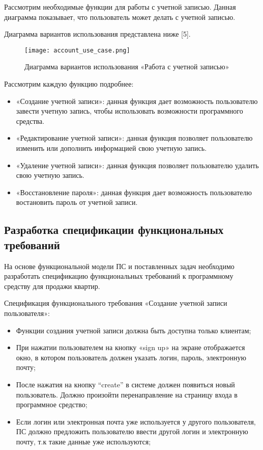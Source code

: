 Рассмотрим необходимые функции для работы с учетной записью. Данная диаграмма показывает, что пользователь может делать с учетной записью. 

Диаграмма вариантов использования представлена ниже [5].

\begin{figure}[!htb]
	\centering
	\texttt{[image: account\_use\_case.png]}
	\caption{ Диаграмма вариантов использования «Работа с учетной записью»}
	\label{fig:arch_and_mod::lexer_flow}
	\clearpage
\end{figure}

Рассмотрим каждую функцию подробнее:

\begin{itemize}
	\item «Создание учетной записи»: данная функция дает возможность пользователю завести учетную запись, чтобы использовать возможности программного средства.
	\item «Редактирование учетной записи»: данная функция позволяет пользователю изменить или дополнить информацией свою учетную запись.
	\item «Удаление учетной записи»: данная функция позволяет пользователю удалить свою учетную запись.
	\item «Восстановление пароля»: данная функция дает возможность пользователю востановить пароль от учетной записи. 
\end{itemize}

\subsection{Разработка спецификации функциональных требований}

На основе функциональной модели ПС и поставленных задач необходимо разработать спецификацию функциональных требований к программному средству для продажи квартир.

Спецификация функционального требования «Создание учетной записи пользователя»:

\begin{itemize}
	\item Функции создания учетной записи должна быть доступна только клиентам;
	\item При нажатии пользователем на кнопку «sign up» на экране отображается окно, в котором пользователь должен указать логин, пароль, электронную почту;
	\item  После нажатия на кнопку “create” в системе должен появиться новый пользователь. Должно произойти перенаправление на страницу входа в программное средство; 
	\item Если логин или электронная почта уже используется у другого пользователя, ПС должно предложить пользователю ввести другой логин и электронную почту, т.к такие данные уже используются;
\end{itemize}

